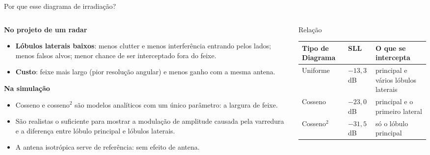 \documentclass[aspectratio=169, 10pt]{beamer}
\newcommand{\rot}[2]{\textbf{\textcolor{#1}{#2}}}
\newcommand{\cab}[1]{\textbf{\textcolor{radarcyan}{#1}}}
\begin{document}
\begin{frame}[t]{Por que esse diagrama de irradiação?}
  \footnotesize
  \begin{columns}[T,onlytextwidth]
    \begin{column}{0.49\textwidth}
      \rot{radarcyan}{No projeto de um radar}
      \begin{itemize}\setlength{\itemsep}{1pt}
        \item \textbf{Lóbulos laterais baixos}: menos clutter e menos interferência entrando pelos lados; menos falsos alvos; menor chance de ser interceptado fora do feixe.
        \item \textbf{Custo}: feixe mais largo (pior resolução angular) e menos ganho com a mesma antena.
      \end{itemize}
      \vspace{2pt}
      \rot{radarcyan}{Na simulação}
      \begin{itemize}\setlength{\itemsep}{1pt}
        \item Cosseno e cosseno$^2$ são modelos analíticos com um único parâmetro: a largura de feixe.
        \item São realistas o suficiente para mostrar a modulação de amplitude causada pela varredura e a diferença entre lóbulo principal e lóbulos laterais.
        \item A antena isotrópica serve de referência: sem efeito de antena.
      \end{itemize}
    \end{column}
    \begin{column}{0.49\textwidth}
      \begin{block}{Relação}
        \footnotesize
        \renewcommand{\arraystretch}{1.1}
        \begin{tabular}{@{}L{1.8cm}L{1.5cm}L{2.6cm}@{}}
          \cab{Tipo de Diagrama} & \cab{SLL} & \cab{O que se intercepta} \\
          \midrule
          Uniforme & $-13{,}3$\,dB & principal e vários lóbulos laterais \\
          Cosseno & $-23{,}0$\,dB & principal e o primeiro lateral \\
          Cosseno$^2$ & $-31{,}5$\,dB & só o lóbulo principal \\
        \end{tabular}
      \end{block}
    \end{column}
  \end{columns}
\end{frame}
\end{document}
